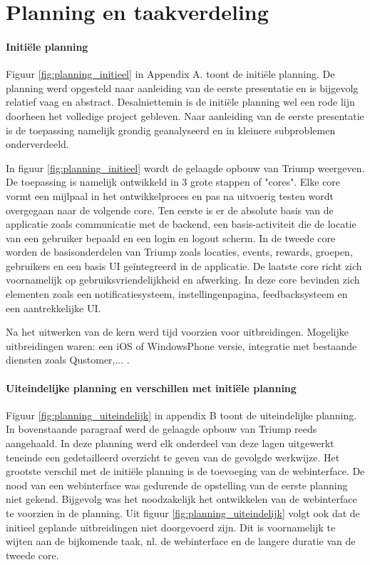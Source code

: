 
\chapter{Planning en taakverdeling}


\subsubsection{Initiële planning}

Figuur \ref{fig:planning_initieel} in Appendix A. toont de initiële planning. De planning werd opgesteld naar aanleiding van de eerste presentatie en is bijgevolg relatief vaag en abstract. Desalniettemin is de initiële planning wel een rode lijn doorheen het volledige project gebleven. Naar aanleiding van de eerste presentatie is de toepassing namelijk grondig geanalyseerd en in kleinere subproblemen onderverdeeld.

In figuur \ref{fig:planning_initieel} wordt de gelaagde opbouw van Triump weergeven. De toepassing is namelijk ontwikkeld in 3 grote stappen of "cores". Elke core vormt een mijlpaal in het ontwikkelproces en pas na uitvoerig testen wordt overgegaan naar de volgende core. 
Ten eerste is er de absolute basis van de applicatie zoals communicatie met de backend, een basis-activiteit die de locatie van een gebruiker bepaald en een login en logout scherm. In de tweede core worden de basisonderdelen van Triump zoals locaties, events, rewards, groepen, gebruikers en een basis UI geïntegreerd in de applicatie. De laatste core richt zich voornamelijk op gebruiksvriendelijkheid en afwerking. In deze core bevinden zich elementen zoals een notificatiesysteem, instellingenpagina, feedbacksysteem en een aantrekkelijke UI.

Na het uitwerken van de kern werd tijd voorzien voor uitbreidingen. Mogelijke uitbreidingen waren: een iOS of WindowsPhone versie, integratie met bestaande diensten zoals Qustomer,... . 

\subsubsection{Uiteindelijke planning en verschillen met initiële planning}

Figuur \ref{fig:planning_uiteindelijk} in appendix B toont de uiteindelijke planning. In bovenstaande paragraaf werd de gelaagde opbouw van Triump reeds aangehaald. In deze planning werd elk onderdeel van deze lagen uitgewerkt teneinde een gedetailleerd overzicht te geven van de gevolgde werkwijze. Het grootste verschil met de initiële planning is de toevoeging van de webinterface. De nood van een webinterface was gedurende de opstelling van de eerste planning niet gekend. Bijgevolg was het noodzakelijk het ontwikkelen van de webinterface te voorzien in de planning. 
Uit figuur \ref{fig:planning_uiteindelijk} volgt ook dat de initieel geplande uitbreidingen niet doorgevoerd zijn. Dit is voornamelijk te wijten aan de bijkomende taak, nl. de webinterface en de langere duratie van de tweede core.

